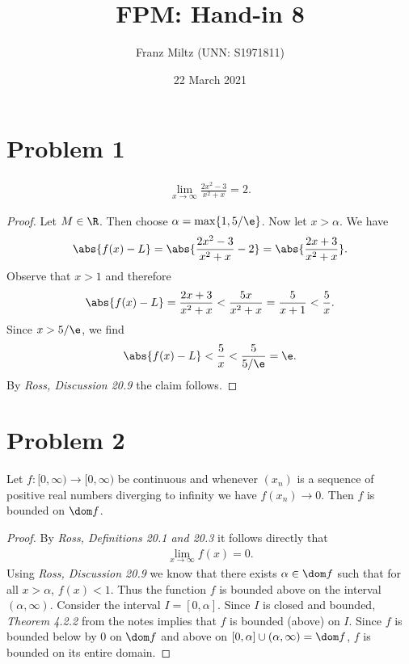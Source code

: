 \documentclass{article}
\begin{document}
\title{FPM: Hand-in 8}
\author{Franz Miltz (UNN: S1971811)}
\date{22 March 2021}
\maketitle
\mkthms
\section*{Problem 1}

\begin{claim*}
    \begin{align*}
        \lim_{x\to\infty} \frac{2x^2-3}{x^2+x}=2.
    \end{align*}
\end{claim*}

\begin{proof}
    Let $M\in\R$. Then choose $\alpha=\max\{1, 5/\e\}$. Now let $x>\alpha$.
    We have
    \begin{align*}
        \abs{f(x)-L} = \abs{\frac{2x^2-3}{x^2+x}-2} = \abs{\frac{2x+3}{x^2+x}}.
    \end{align*}
    Observe that $x>1$ and therefore
    \begin{align*}
        \abs{f(x)-L} = \frac{2x+3}{x^2+x}< \frac{5x}{x^2+x} = \frac{5}{x+1} < \frac{5}{x}.
    \end{align*}
    Since $x>5/\e$, we find
    \begin{align*}
        \abs{f(x)-L} < \frac{5}{x} < \frac{5}{5/\e} = \e.
    \end{align*}
    By \emph{Ross, Discussion 20.9} the claim follows.
\end{proof}

\section*{Problem 2}

\begin{claim*}
    Let $f:[0,\infty)\to[0,\infty)$ be continuous and whenever
    $(x_n)$ is a sequence of positive real numbers diverging to
    infinity we have $f(x_n)\to 0$. Then $f$ is bounded on $\dom f$.
\end{claim*}

\begin{proof}
    By \emph{Ross, Definitions 20.1 and 20.3} it follows directly that
    \begin{align*}
        \lim_{x\to \infty} f(x) = 0.
    \end{align*}
    Using \emph{Ross, Discussion 20.9} we know that there
    exists $\alpha\in \dom f$ such that for all $x>\alpha$, $f(x)<1$.
    Thus the function $f$ is bounded above on the interval
    $(\alpha, \infty)$. Consider the interval $I=[0,\alpha]$. Since $I$
    is closed and bounded, \emph{Theorem 4.2.2} from the notes implies
    that $f$ is bounded (above) on $I$. Since $f$ is bounded below by 
    $0$ on $\dom f$ and above on $[0,\alpha]\cup(\alpha,\infty)=\dom f$,
    $f$ is bounded on its entire domain.
\end{proof}
\end{document}
